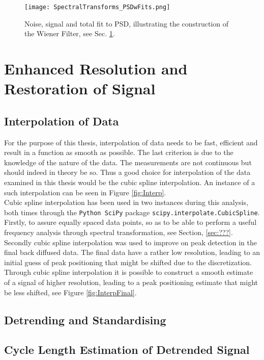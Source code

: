 \documentclass[../../CompleteThesis/Complete_1stDraft]{subfiles}
\begin{document}
	\begin{figure}
		\centering
		\texttt{[image: SpectralTransforms\_PSDwFits.png]}
		\caption[FFT, DCT, NDCT PSDs with Fit, Site A]{Noise, signal and total fit to PSD, illustrating the construction of the Wiener Filter, see Sec. \ref{Sec:SignalAnalysis_Restoration}.}
		\label{fig:SpectralTransforms_PSDwFits}
	\end{figure}
	
	
	\section[Restoration][Restoration]{Enhanced Resolution and Restoration of Signal}
	\label{Sec:SignalAnalysis_Restoration}
	
	\subsection[Interpolation]{Interpolation of Data}
	\label{Subsec:SignalAnalysis_Restoration_Interpolation}
	For the purpose of this thesis, interpolation of data needs to be fast, efficient and result in a function as smooth as possible. The last criterion is due to the knowledge of the nature of the data. The measurements are not continuous but should indeed in theory be so. Thus a good choice for interpolation of the data examined in this thesis would be the cubic spline interpolation. An instance of a such interpolation can be seen in Figure \ref{fig:Interp}.\\
	Cubic spline interpolation has been used in two instances during this analysis, both times through the \lstinline[language=Python]|Python SciPy| package \lstinline[language=Python]|scipy.interpolate.CubicSpline|. Firstly, to assure equally spaced data points, so as to be able to perform a useful frequency analysis through spectral transformation, see Section, \ref{sec:???}. Secondly cubic spline interpolation was used to improve on peak detection in the final back diffused data. The final data have a rather low resolution, leading to an initial guess of peak positioning that might be shifted due to the discretization. Through cubic spline interpolation it is possible to construct a smooth estimate of a signal of higher resolution, leading to a peak positioning estimate that might be less shifted, see Figure \ref{fig:InterpFinal}.
	
	\subsection[Standardisation]{Detrending and Standardising}
	\label{Subsec:SignalAnalysis_Restoration_Standardisation}
	
	\subsection[Cycle Length Estimation][Cycle Length Estimation]{Cycle Length Estimation of Detrended Signal}
	\label{Subsec:SignalAnalysis_Restoration_CycleLengthEst}
	
\end{document}
